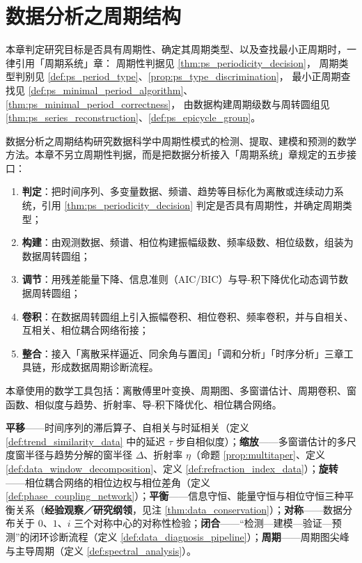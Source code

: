 \chapter{数据分析之周期结构}

\begin{remark}[本章目标的周期性判定（引用）]\label{rem:data_ps_hook}
本章判定研究目标是否具有周期性、确定其周期类型、以及查找最小正周期时，一律引用「周期系统」章：
周期性判据见 \cref{thm:ps_periodicity_decision}，
周期类型判别见 \cref{def:ps_period_type}、\cref{prop:ps_type_discrimination}，
最小正周期查找见 \cref{def:ps_minimal_period_algorithm}、\cref{thm:ps_minimal_period_correctness}，
由数据构建周期级数与周转圆组见 \cref{thm:ps_series_reconstruction}、\cref{def:ps_epicycle_group}。
\end{remark}

\begin{remark}\label{rem:data_five_steps_positioning}
数据分析之周期结构研究数据科学中周期性模式的检测、提取、建模和预测的数学方法。本章不另立周期性判据，而是把数据分析接入「周期系统」章规定的五步接口：
\begin{enumerate}[label=(\arabic*)]
    \item \textbf{判定}：把时间序列、多变量数据、频谱、趋势等目标化为离散或连续动力系统，引用 \cref{thm:ps_periodicity_decision} 判定是否具有周期性，并确定周期类型；
    \item \textbf{构建}：由观测数据、频谱、相位构建振幅级数、频率级数、相位级数，组装为数据周转圆组；
    \item \textbf{调节}：用残差能量下降、信息准则（AIC/BIC）与导-积下降优化动态调节数据周转圆组；
    \item \textbf{卷积}：在数据周转圆组上引入振幅卷积、相位卷积、频率卷积，并与自相关、互相关、相位耦合网络衔接；
    \item \textbf{整合}：接入「离散采样逼近、同余角与置闰」「调和分析」「时序分析」三章工具链，形成数据周期诊断流程。
\end{enumerate}
本章使用的数学工具包括：离散傅里叶变换、周期图、多窗谱估计、周期卷积、窗函数、相似度与趋势、折射率、导-积下降优化、相位耦合网络。
\end{remark}

\begin{remark}[本章七主题导引]\label{rem:data_seven_themes}
\textbf{平移}——时间序列的滞后算子、自相关与时延相关（定义 \ref{def:trend_similarity_data} 中的延迟 $\tau$ 步自相似度）；\textbf{缩放}——多窗谱估计的多尺度窗半径与趋势分解的窗半径 $\Delta$、折射率 $\eta$（命题 \ref{prop:multitaper}、定义 \ref{def:data_window_decomposition}、定义 \ref{def:refraction_index_data}）；\textbf{旋转}——相位耦合网络的相位边权与相位差角（定义 \ref{def:phase_coupling_network}）；\textbf{平衡}——信息守恒、能量守恒与相位守恒三种平衡关系（\textbf{经验观察／研究纲领}，见注 \ref{thm:data_conservation}）；\textbf{对称}——数据分布关于 $0$、$1$、$i$ 三个对称中心的对称性检验；\textbf{闭合}——“检测—建模—验证—预测”的闭环诊断流程（定义 \ref{def:data_diagnosis_pipeline}）；\textbf{周期}——周期图尖峰与主导周期（定义 \ref{def:spectral_analysis}）。
\end{remark}

